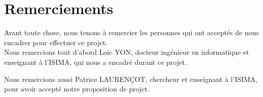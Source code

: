 \cleardoublepage



\chapter*{Remerciements}

\thispagestyle{empty}



Avant toute chose, nous tenons à remercier les personnes qui ont acceptés de nous encadrer pour effectuer ce projet.
\\


Nous remercions tout d'abord Loïc YON, docteur ingénieur en informatique et enseignant à l'ISIMA, qui nous a encadré durant ce projet.

Nous remercions aussi Patrice LAURENÇOT, chercheur et enseignant à l'ISIMA, pour avoir accepté notre proposition de projet.

